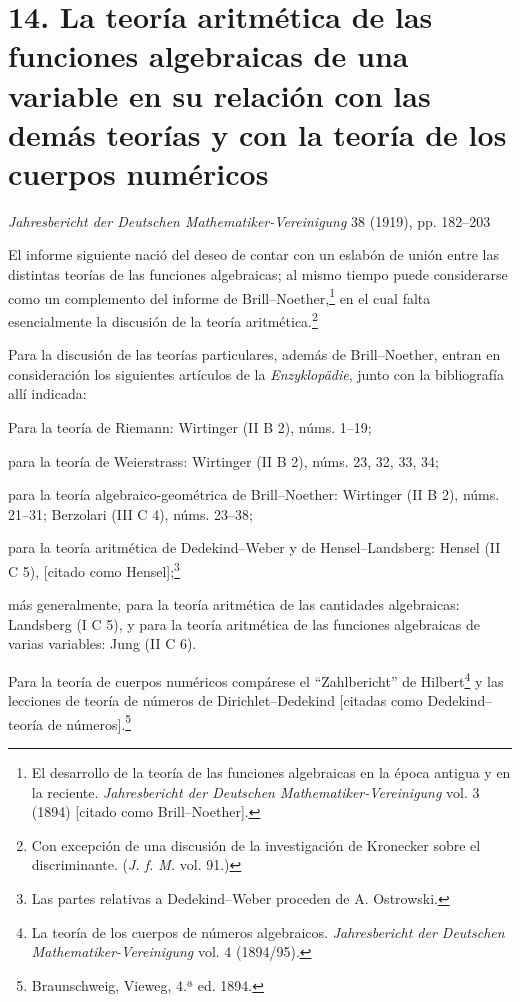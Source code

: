 \documentclass[11pt]{article}
\begin{document}
\section*{14. La teoría aritmética de las funciones algebraicas de una variable en su relación con las demás teorías y con la teoría de los cuerpos numéricos}
\begin{center}
\emph{Jahresbericht der Deutschen Mathematiker-Vereinigung} 38 (1919), pp. 182--203
\end{center}

El informe siguiente nació del deseo de contar con un eslabón de unión entre las distintas teorías de las funciones algebraicas; al mismo tiempo puede considerarse como un complemento del informe de Brill--Noether,\footnote{El desarrollo de la teoría de las funciones algebraicas en la época antigua y en la reciente. \emph{Jahresbericht der Deutschen Mathematiker-Vereinigung} vol. 3 (1894) [citado como Brill--Noether].} en el cual falta esencialmente la discusión de la teoría aritmética.\footnote{Con excepción de una discusión de la investigación de Kronecker sobre el discriminante. (\emph{J. f. M.} vol. 91.)}

Para la discusión de las teorías particulares, además de Brill--Noether, entran en consideración los siguientes artículos de la \emph{Enzyklopädie}, junto con la bibliografía allí indicada:

Para la teoría de Riemann: Wirtinger (II B 2), núms. 1--19;

para la teoría de Weierstrass: Wirtinger (II B 2), núms. 23, 32, 33, 34;

para la teoría algebraico-geométrica de Brill--Noether: Wirtinger (II B 2), núms. 21--31; Berzolari (III C 4), núms. 23--38;

para la teoría aritmética de Dedekind--Weber y de Hensel--Landsberg: Hensel (II C 5), [citado como Hensel];\footnote{Las partes relativas a Dedekind--Weber proceden de A. Ostrowski.}

más generalmente, para la teoría aritmética de las cantidades algebraicas: Landsberg (I C 5), y para la teoría aritmética de las funciones algebraicas de varias variables: Jung (II C 6).

Para la teoría de cuerpos numéricos compárese el ``Zahlbericht'' de Hilbert\footnote{La teoría de los cuerpos de números algebraicos. \emph{Jahresbericht der Deutschen Mathematiker-Vereinigung} vol. 4 (1894/95).} y las lecciones de teoría de números de Dirichlet--Dedekind [citadas como Dedekind--teoría de números].\footnote{Braunschweig, Vieweg, 4.ª ed. 1894.}
\end{document}
